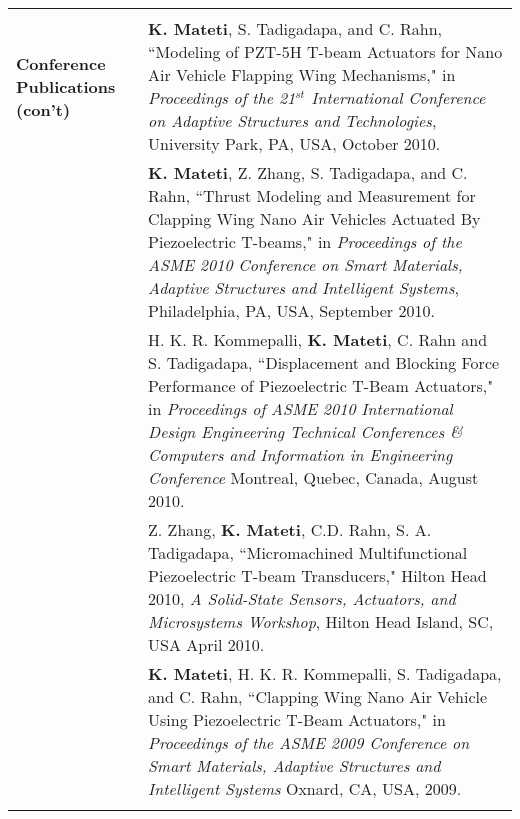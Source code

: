 \documentclass{article}[16pt]
\newlength{\lcolw}
\newlength{\rcolw}
\newlength{\hlcolw}
\begin{document}
\begin{tabular}{L{\hlcolw}  L{\rcolw}}
\hline \\
\textbf{\Large Conference Publications (con't)} 
& \textbf{K. Mateti}, S. Tadigadapa, and C. Rahn, ``Modeling of PZT-5H T-beam Actuators for Nano Air Vehicle Flapping Wing Mechanisms," in {\it Proceedings of the 21$^{st}$ International Conference on Adaptive Structures and Technologies}, University Park, PA, USA, October 2010.
\vspace{0.1in} \\ 
& \textbf{K. Mateti}, Z. Zhang, S. Tadigadapa, and C. Rahn, ``Thrust Modeling and Measurement for Clapping Wing Nano Air Vehicles Actuated By Piezoelectric T-beams," in {\it Proceedings of the ASME 2010 Conference on Smart Materials, Adaptive Structures and Intelligent Systems}, Philadelphia, PA, USA, September 2010.
\vspace{0.1in} \\ 
& H. K. R. Kommepalli, \textbf{K. Mateti}, C. Rahn and  S. Tadigadapa, ``Displacement and Blocking Force Performance of Piezoelectric T-Beam Actuators," in {\it Proceedings of ASME 2010 International Design Engineering Technical Conferences \& Computers and Information in Engineering Conference} Montreal, Quebec, Canada, August 2010.
\vspace{0.1in} \\ 
& Z. Zhang, \textbf{K. Mateti}, C.D. Rahn, S. A. Tadigadapa, ``Micromachined Multifunctional Piezoelectric T-beam Transducers," Hilton Head 2010, {\it A Solid-State Sensors, Actuators, and Microsystems Workshop}, Hilton Head Island, SC, USA April 2010.
\vspace{0.1in} \\ 
& \textbf{K. Mateti}, H. K. R. Kommepalli, S. Tadigadapa, and C. Rahn, ``Clapping Wing Nano Air Vehicle Using Piezoelectric T-Beam Actuators," in {\it Proceedings of the ASME 2009 Conference on Smart Materials, Adaptive Structures and Intelligent Systems} Oxnard, CA, USA, 2009.
\vspace{0.1in} \\ 
\hline \\
\end{tabular}
\end{document}
